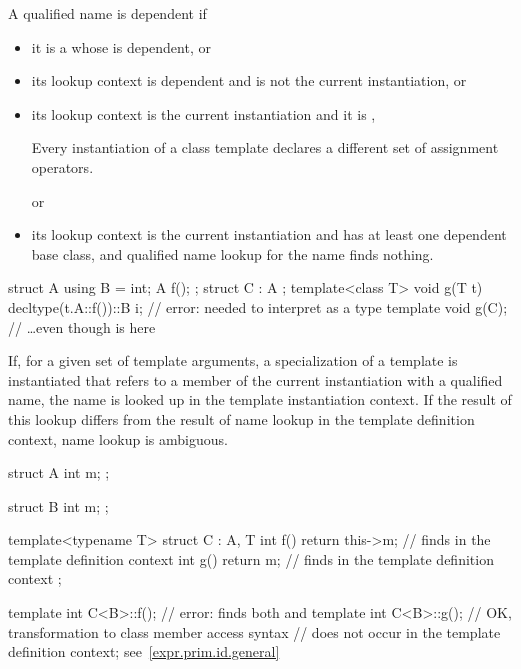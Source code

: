 \pnum
A qualified name is dependent if

\begin{itemize}
\item
it is a 
whose  is dependent, or
\item
its lookup context is dependent and is not the current instantiation, or
\item
its lookup context is the current instantiation and
it is ,
\begin{footnote}
Every instantiation of a class template declares
a different set of assignment operators.
\end{footnote}
or
\item
its lookup context is the current instantiation and
has at least one dependent base class, and
qualified name lookup for the name finds nothing.
\end{itemize}
\begin{example}
\begin{codeblock}
struct A {
  using B = int;
  A f();
};
struct C : A {};
template<class T>
void g(T t) {
  decltype(t.A::f())::B i;      // error:  needed to interpret  as a type
}
template void g(C);             // \ldots even though  is  here
\end{codeblock}
\end{example}

\pnum
If, for a given set of template arguments, a specialization of a template is
instantiated that refers to a member of the current instantiation with a
qualified name, the name is looked up in the
template instantiation context. If the result of this lookup differs from the
result of name lookup in the template definition context, name lookup is
ambiguous.
\begin{example}
\begin{codeblock}
struct A {
  int m;
};

struct B {
  int m;
};

template<typename T>
struct C : A, T {
  int f() { return this->m; }   // finds  in the template definition context
  int g() { return m; }         // finds  in the template definition context
};

template int C<B>::f();         // error: finds both  and 
template int C<B>::g();         // OK, transformation to class member access syntax
                                // does not occur in the template definition context; see~\ref{expr.prim.id.general}
\end{codeblock}
\end{example}

